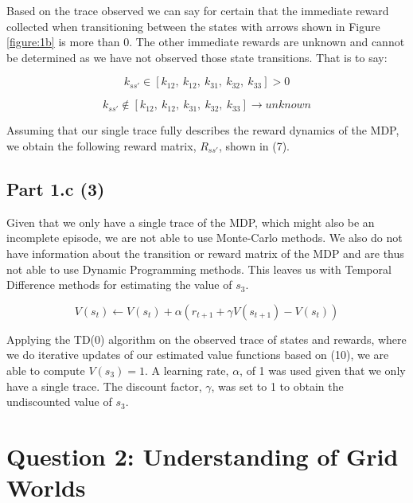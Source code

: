 \documentclass[12pt]{article}
\begin{document}
Based on the trace observed we can say for certain that the immediate reward collected when transitioning between the states with arrows shown in Figure \ref{figure:1b} is more than 0. The other immediate rewards are unknown and cannot be determined as we have not observed those state transitions. That is to say:\vspace{1em}

\begin{minipage}{.5\textwidth}
    \noindent
    \begin{equation}
        k_{ss'} \in [k_{12},\ k_{12},\ k_{31},\ k_{32},\ k_{33}] > 0
    \end{equation}
\end{minipage}
\begin{minipage}{.5\textwidth}
    \noindent
    \begin{equation}
        k_{ss'} \not\in [k_{12},\ k_{12},\ k_{31},\ k_{32},\ k_{33}] \rightarrow unknown
    \end{equation}
\end{minipage}
\vspace{0.1em}

Assuming that our single trace fully describes the reward dynamics of the MDP, we obtain the following reward matrix, \(R_{ss'}\), shown in (7).

\subsection*{Part 1.c (3)}
Given that we only have a single trace of the MDP, which might also be an incomplete episode, we are not able to use Monte-Carlo methods. We also do not have information about the transition or reward matrix of the MDP and are thus not able to use Dynamic Programming methods. This leaves us with Temporal Difference methods for estimating the value of \(s_3\).

\begin{equation}
V(s_t) \leftarrow V(s_t) + \alpha (r_{t+1} + \gamma V(s_{t+1}) - V(s_t))
\end{equation}

Applying the TD(0) algorithm on the observed trace of states and rewards, where we do iterative updates of our estimated value functions based on (10), we are able to compute \(V(s_3) = 1\). A learning rate, \(\alpha\), of 1 was used given that we only have a single trace. The discount factor, \(\gamma\), was set to 1 to obtain the undiscounted value of \(s_3\).\medskip

\section*{Question 2: Understanding of Grid Worlds}
\end{document}
